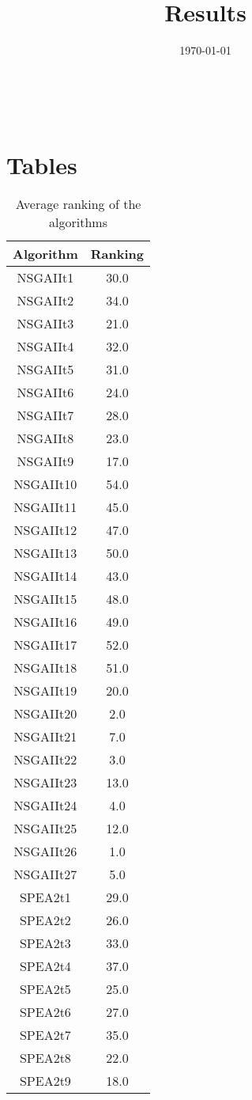 \documentclass{article}
\title{Results}
\author{}
\date{\today}
\begin{document}
\oddsidemargin 0in \topmargin 0in\maketitle
\
\section{Tables}
\begin{table}[!htp]
\centering
\caption{Average ranking of the algorithms}
\begin{tabular}{c|c}
Algorithm&Ranking\\
\hline
NSGAIIt1&30.0\\
NSGAIIt2&34.0\\
NSGAIIt3&21.0\\
NSGAIIt4&32.0\\
NSGAIIt5&31.0\\
NSGAIIt6&24.0\\
NSGAIIt7&28.0\\
NSGAIIt8&23.0\\
NSGAIIt9&17.0\\
NSGAIIt10&54.0\\
NSGAIIt11&45.0\\
NSGAIIt12&47.0\\
NSGAIIt13&50.0\\
NSGAIIt14&43.0\\
NSGAIIt15&48.0\\
NSGAIIt16&49.0\\
NSGAIIt17&52.0\\
NSGAIIt18&51.0\\
NSGAIIt19&20.0\\
NSGAIIt20&2.0\\
NSGAIIt21&7.0\\
NSGAIIt22&3.0\\
NSGAIIt23&13.0\\
NSGAIIt24&4.0\\
NSGAIIt25&12.0\\
NSGAIIt26&1.0\\
NSGAIIt27&5.0\\
SPEA2t1&29.0\\
SPEA2t2&26.0\\
SPEA2t3&33.0\\
SPEA2t4&37.0\\
SPEA2t5&25.0\\
SPEA2t6&27.0\\
SPEA2t7&35.0\\
SPEA2t8&22.0\\
SPEA2t9&18.0\\

\end{tabular}
\end{table}
\end{document}

